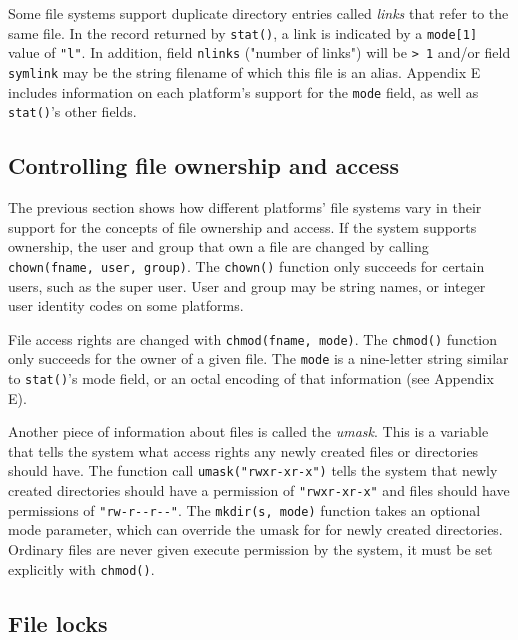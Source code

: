 Some file systems support duplicate directory entries called
\textit{links} that refer to the same file. In the record returned by
\texttt{stat()}, a link is indicated by a
\texttt{mode[1]} value of \texttt{"l"}. In addition, field
\texttt{nlinks} ("number of links") will be \texttt{{\textgreater} 1}
and/or field \texttt{symlink} may be the string filename of which this
file is an alias. Appendix E includes information on each platform's
support for the \texttt{mode} field, as well as \texttt{stat()}'s
other fields.

\subsection*{Controlling file ownership and access}

The previous section shows how different
platforms' file systems vary in their support for the concepts of file
ownership and access. If the system supports ownership, the user and
group that own a file are changed by calling \texttt{chown(fname,
user, group)}. The \texttt{chown()} function only
succeeds for certain users, such as the super user.  User and group
may be string names, or integer user identity codes on some platforms.

File access rights are changed with \texttt{chmod(fname, mode)}. The
\texttt{chmod()} function only succeeds for the owner of a given
file. The \texttt{mode} is a nine-letter string similar to \texttt{stat()}'s
mode field, or an octal encoding of that information (see Appendix E).

Another piece of information about files is called the
\textit{umask}. This is a variable that tells the system what
access rights any newly created files or directories should have.  The function
call \texttt{umask("rwxr-xr-x")} tells the system that newly created directories
should have a permission of \texttt{"rwxr-xr-x"} and files should have
permissions of \texttt{"rw-r-{}-r-{}-"}.  The \texttt{mkdir(s, mode)} function
takes an optional mode parameter, which can override the umask for for newly
created directories.  Ordinary files are never given execute permission by the
system, it must be set explicitly with \texttt{chmod()}.

\subsection*{File locks}

